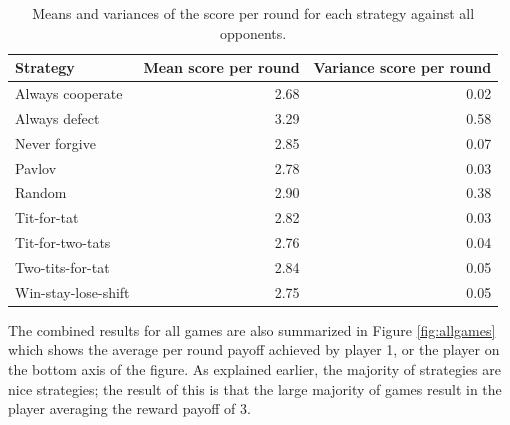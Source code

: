 \documentclass[a4paper]{article}
\begin{document}
\begin{table}[h!]
    \centering
    \begin{tabular}{lrr}
    Strategy            & Mean score per round & Variance score per round \\ \hline
    Always cooperate    & 2.68                 & 0.02                     \\
    Always defect       & 3.29                 & 0.58                     \\
    Never forgive       & 2.85                 & 0.07                     \\
    Pavlov              & 2.78                 & 0.03                     \\
    Random              & 2.90                 & 0.38                     \\
    Tit-for-tat         & 2.82                 & 0.03                     \\
    Tit-for-two-tats    & 2.76                 & 0.04                     \\
    Two-tits-for-tat    & 2.84                 & 0.05                     \\
    Win-stay-lose-shift & 2.75                 & 0.05                    
    \end{tabular}
    \caption{Means and variances of the score per round for each strategy against all opponents.}
    \label{tab:allgameresults}
\end{table}

The combined results for all games are also summarized in Figure \ref{fig:allgames} which shows the average per round payoff achieved by player 1, or the player on the bottom axis of the figure. As explained earlier, the majority of strategies are nice strategies; the result of this is that the large majority of games result in the player averaging the reward payoff of 3. 
\end{document}
